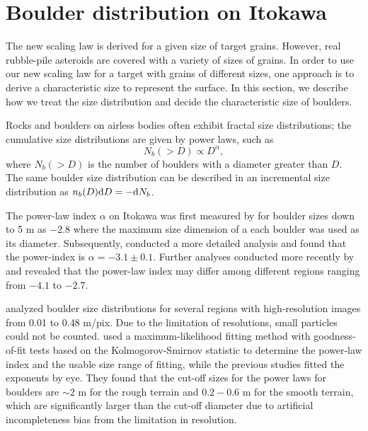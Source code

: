 \documentclass[3p,authoryear]{elsarticle}
\begin{document}
\section{Boulder distribution on Itokawa} \label{boulder-dist}
The new scaling law is derived for a given size of target grains. However, real rubble-pile asteroids are covered with a variety of sizes of grains. In order to use our new scaling law for a target with grains of different sizes, one approach is to derive a characteristic size to represent the surface. In this section, we describe how we treat the size distribution and decide the characteristic size of boulders.

Rocks and boulders on airless bodies often exhibit fractal size distributions; the cumulative size distributions are given by power laws, such as\begin{equation}
	N_b(>D) \propto D^{\alpha}, \label{cdf}
\end{equation}
where $N_b(>D)$ is the number of boulders with a diameter greater than $D$.
The same boulder size distribution can be described in an incremental size distribution as $n_b(D){\rm d} D =- {\rm d} N_b$.

The power-law index $\alpha$ on Itokawa was first measured by \citet{saito2006} for boulder sizes down to 5 m as $-2.8$ where the maximum size dimension of a each boulder was used as its diameter.
Subsequently, \citet{michikami2008} conducted a more detailed analysis and found that the power-index is $\alpha=-3.1\pm 0.1$.
Further analyses conducted more recently by \citet{mazrouei2014} and \citet{tancredi2015} revealed that the power-law index may differ among different regions ranging from $-4.1$ to $-2.7$.

\citet{tancredi2015} analyzed boulder size distributions for several regions with high-resolution images from 0.01 to 0.48 m/pix.
Due to the limitation of resolutions, small particles could not be counted.
\citet{tancredi2015} used a maximum-likelihood fitting method with goodness-of-fit tests based on the Kolmogorov-Smirnov statistic to determine the power-law index and the usable size range of fitting, while the previous studies fitted the exponents by eye.
They found that the cut-off sizes for the power laws for boulders are $\sim 2$ m for the rough terrain and $0.2 - 0.6$ m for the smooth terrain, which are significantly larger than the cut-off diameter due to artificial incompleteness bias from the limitation in resolution.
\end{document}
